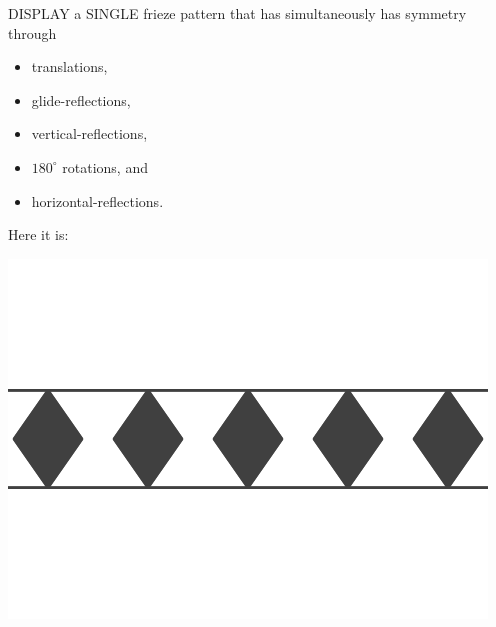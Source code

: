 \documentclass[noauthor,nooutcomes,hints,handout]{ximera}
\begin{document}
\begin{question}
  DISPLAY a SINGLE frieze pattern that has simultaneously has symmetry
  through 
  \begin{itemize}
  \item translations,
  \item glide-reflections,
  \item vertical-reflections,
  \item $180^\circ$ rotations, and
  \item horizontal-reflections.
  \end{itemize}
  \begin{freeResponse}
    Here it is:
    \begin{center}
      \includegraphics[width=.6\textwidth]{ansTGV8H.png}
    \end{center}
  \end{freeResponse}
\end{question}
\end{document}
